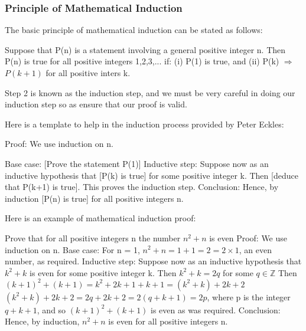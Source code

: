 \subsubsection{Principle of Mathematical Induction}
The basic principle of mathematical induction can be stated as follows:

\begin{theorem}
Suppose that P(n) is a statement involving a general positive integer n. Then P(n) is true for all positive integers 1,2,3,... if:\newline
(i)  P(1) is true, and \newline
(ii) P(k) $\Rightarrow$ $P(k + 1)$ for all positive inters k.
\end{theorem}

Step 2 is known as the induction step, and we must be very careful in doing our induction step so as ensure that our proof is valid.

Here is a template to help in the induction process provided by Peter Eckles: \newline

Proof: We use induction on n.\newline

Base case: [Prove the statement P(1)] \newline
Inductive step: Suppose now as an inductive hypothesis that [P(k) is true] for some positive integer k. Then [deduce that P(k+1) is true]. This proves the induction step. \newline
Conclusion: Hence, by induction [P(n) is true] for all positive integers n. \newline

Here is an example of mathematical induction proof:
\begin{example}
\begin{center}
Prove that for all positive integers n the number $n^2 + n$ is even \newline
Proof: We use induction on n. \newline
Base case: For n = 1, $n^2 + n = 1 + 1 = 2 = 2 \times 1$, an even number, as required. \newline
Inductive step: Suppose now as an inductive hypothesis that $k^2 + k$ is even for some positive integer k. Then $k^2 + k = 2q$ for some $ q \in \mathbb{Z}$ \newline
Then $(k+1)^2 + (k+1) = k^2 + 2k + 1 + k + 1 = (k^2 + k) + 2k + 2$\newline
$(k^2 + k) + 2k + 2 = 2q + 2k + 2 = 2(q + k + 1) = 2p$, where p is the integer $q + k + 1$, and so $(k+1)^2 + (k+1)$ is even as was required.\newline
Conclusion: Hence, by induction, $n^2+n$ is even for all positive integers n.
\end{center}
\end{example}

